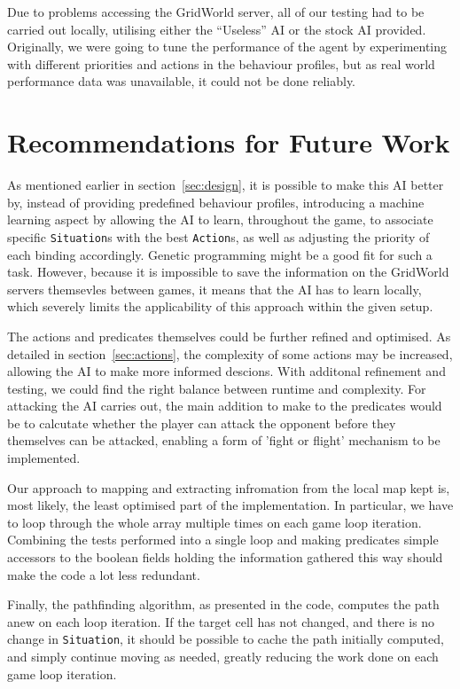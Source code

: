 \documentclass[11pt]{article}
\begin{document}
Due to problems accessing the GridWorld server, all of our testing had to be carried out locally, utilising either the ``Useless'' AI or the stock AI provided. Originally, we were going to tune the performance of the agent by experimenting with different priorities and actions in the behaviour profiles, but as real world performance data was unavailable, it could not be done reliably.

\section{Recommendations for Future Work} \label{sec:futureWork}

As mentioned earlier in section~\ref{sec:design}, it is possible to make this AI better by, instead of providing predefined behaviour profiles, introducing a machine learning aspect by allowing the AI to learn, throughout the game, to associate specific \verb|Situation|s with the best \verb|Action|s, as well as adjusting the priority of each binding accordingly. Genetic programming might be a good fit for such a task. However, because it is impossible to save the information on the GridWorld servers themsevles between games, it means that the AI has to learn locally, which severely limits the applicability of this approach within the given setup.

The actions and predicates themselves could be further refined and optimised. As detailed in section~\ref{sec:actions}, the complexity of some actions may be increased, allowing the AI to make more informed descions. With additonal refinement and testing, we could find the right balance between runtime and complexity.  For  attacking the AI carries out, the main addition to make to the predicates would be to calcutate whether the player can attack the opponent before they themselves can be attacked, enabling a form of 'fight or flight' mechanism to be implemented.

Our approach to mapping and extracting infromation from the local map kept is, most likely, the least optimised part of the implementation. In particular, we have to loop through the whole array multiple times on each game loop iteration. Combining the tests performed into a single loop and making predicates simple accessors to the boolean fields holding the information gathered this way should make the code a lot less redundant.

Finally, the pathfinding algorithm, as presented in the code, computes the path anew on each loop iteration. If the target cell has not changed, and there is no change in \verb|Situation|, it should be possible to cache the path initially computed, and simply continue moving as needed, greatly reducing the work done on each game loop iteration.
\end{document}

